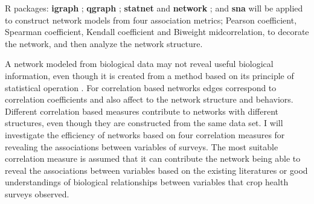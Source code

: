 R packages: \textbf{igraph} ; \textbf{qgraph} ; \textbf{statnet}  and \textbf{network} ; and \textbf{sna}  will be applied to construct network models from four association metrics; Pearson coefficient, Spearman coefficient, Kendall coefficient and Biweight midcorrelation, to decorate the network, and then analyze the network structure.

A network modeled from biological data may not reveal useful biological information, even though it is created from a method based on its principle of statistical operation . For correlation based networks edges correspond to correlation coefficients and also affect to the network structure and behaviors. Different correlation based measures contribute to networks with different structures, even though they are constructed from the same data set. I will investigate the efficiency of networks based on four correlation measures for revealing the associations between variables of surveys. The most suitable correlation measure is assumed that it can contribute the network being able to reveal the associations between variables based on the existing literatures or good understandings of biological relationships between variables that crop health surveys observed.


